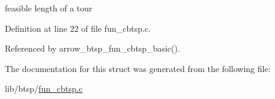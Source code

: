 feasible length of a tour 

Definition at line 22 of file fun\_\-cbtsp.c.

Referenced by arrow\_\-btsp\_\-fun\_\-cbtsp\_\-basic().

The documentation for this struct was generated from the following file:\begin{CompactItemize}
\item 
lib/btsp/\hyperlink{fun__cbtsp_8c}{fun\_\-cbtsp.c}\end{CompactItemize}
